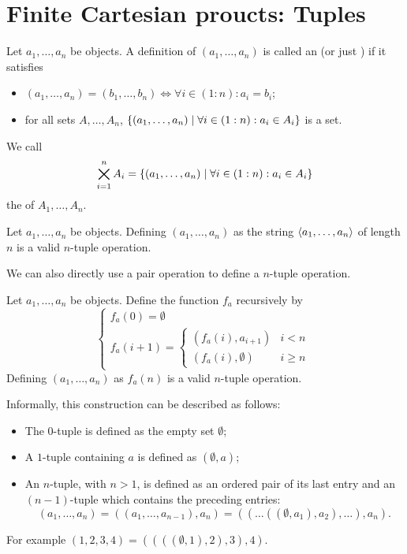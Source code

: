 \section{Finite Cartesian proucts: Tuples}
\begin{definition}
Let $a_1, \ldots, a_n$ be objects. A definition of $(a_1, \ldots, a_n)$ is called an  (or just ) if it satisfies
\begin{itemize}
\item $(a_1, \ldots, a_n) = (b_1, \ldots, b_n) \iff \forall i\in (1:n): a_i=b_i$;
\item for all sets $A,\ldots, A_n$, $\left\{ (a_1,\ldots, a_n) \;\middle|\; \forall i\in (1:n): a_i \in A_i \right\}$ is a set.
\end{itemize}
We call
\[ \bigtimes_{i=1}^nA_i = \left\{ (a_1,\ldots, a_n) \;\middle|\; \forall i\in (1:n): a_i \in A_i \right\} \]
the  of $A_1,\ldots, A_n$.
\end{definition}

\begin{proposition} \label{pairNTupleDefinition}
Let $a_1, \ldots, a_n$ be objects. Defining $(a_1, \ldots, a_n)$ as the string $\left\langle a_1, \ldots, a_n \right\rangle$ of length $n$ is a valid $n$-tuple operation.
\end{proposition}

We can also directly use a pair operation to define a $n$-tuple operation.
\begin{proposition}
Let $a_1, \ldots, a_n$ be objects. Define the function $f_a$ recursively by
\[ \begin{cases}
f_a(0) = \emptyset \\
f_a(i+1) = \begin{cases}
(f_a(i), a_{i+1}) & i < n \\
(f_a(i), \emptyset) & i \geq n
\end{cases}
\end{cases} \]
Defining $(a_1, \ldots, a_n)$ as $f_a(n)$ is a valid $n$-tuple operation.
\end{proposition}

Informally, this construction can be described as follows:
\begin{itemize}
\item The $0$-tuple is defined as the empty set $\emptyset$;
\item A $1$-tuple containing $a$ is defined as $(\emptyset, a)$;
\item An $n$-tuple, with $n > 1$, is defined as an ordered pair of its last entry and an $(n - 1)$-tuple which contains the preceding entries:
\[ (a_1, \ldots, a_n) = ((a_1, \ldots, a_{n-1}), a_n) = ((\ldots((\emptyset, a_1), a_2), \ldots), a_n). \]
\end{itemize}
For example $(1,2,3,4) = ((((\emptyset, 1), 2), 3), 4)$.

